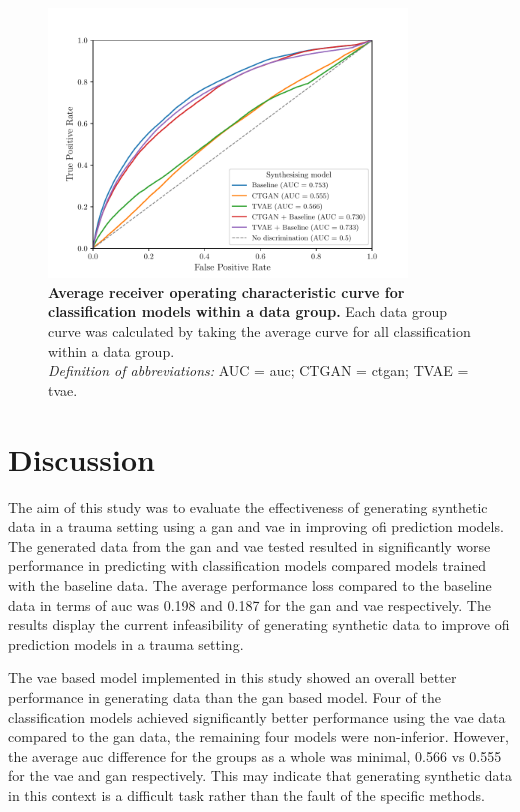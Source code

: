 \documentclass[12pt, a4paper]{article}
\begin{document}
\begin{figure}
    \centering
    \includegraphics[width=0.85\textwidth]{figures/roc.pdf}
    \caption{\textbf{Average receiver operating characteristic curve for classification models within a data group.} Each data group curve was calculated by taking the average curve for all classification within a data group. \\
        \textit{Definition of abbreviations:} AUC = \Acrlong{auc}; CTGAN = \Acrlong{ctgan}; TVAE = \Acrlong{tvae}.}
    \label{fig:roc}
\end{figure}

\newpage

\section{Discussion}
The aim of this study was to evaluate the effectiveness of generating synthetic data in a trauma setting using a \acrshort{gan} and \acrshort{vae} in improving \acrshort{ofi} prediction models. The generated data from the \acrshort{gan} and \acrshort{vae} tested resulted in significantly worse performance in predicting  with classification models compared models trained with the baseline data. The average performance loss compared to the baseline data in terms of \acrshort{auc} was 0.198 and 0.187 for the \acrshort{gan} and \acrshort{vae} respectively. The results display the current infeasibility of generating synthetic data to improve \acrshort{ofi} prediction models in a trauma setting.

The \acrshort{vae} based model implemented in this study showed an overall better performance in generating data than the \acrshort{gan} based model. Four of the classification models achieved significantly better performance using the \acrshort{vae} data compared to the \acrshort{gan} data, the remaining four models were non-inferior. However, the average \acrshort{auc} difference for the groups as a whole was minimal, 0.566 vs 0.555 for the \acrshort{vae} and \acrshort{gan} respectively. This may indicate that generating synthetic data in this context is a difficult task rather than the fault of the specific methods.
\end{document}
